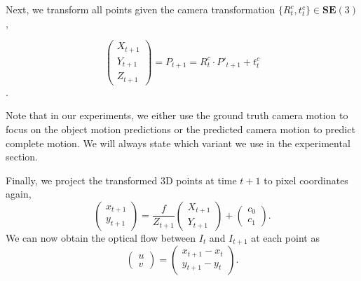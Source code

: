 Next, we transform all points given the camera transformation $\{R_t^c, t_t^c\} \in \mathbf{SE}(3)$, %

\begin{equation}
\begin{pmatrix}
X_{t+1} \\ Y_{t+1} \\ Z_{t+1}
\end{pmatrix}
= P_{t+1} = R_t^c \cdot P'_{t+1} + t_t^c
\end{equation}.

Note that in our experiments, we either use the ground truth camera motion to focus
on the object motion predictions or the predicted camera motion to predict complete
motion. We will always state which variant we use in the experimental section.

Finally, we project the transformed 3D points at time $t+1$ to pixel coordinates again,
\begin{equation}
\begin{pmatrix}
x_{t+1} \\ y_{t+1}
\end{pmatrix}
=
\frac{f}{Z_{t+1}}
\begin{pmatrix}
X_{t+1} \\ Y_{t+1}
\end{pmatrix}
+
\begin{pmatrix}
c_0 \\ c_1
\end{pmatrix}.
\end{equation}
We can now obtain the optical flow between $I_t$ and $I_{t+1}$ at each point as
\begin{equation}
\begin{pmatrix}
u \\ v
\end{pmatrix}
=
\begin{pmatrix}
x_{t+1} - x_{t} \\ y_{t+1} - y_{t}
\end{pmatrix}.
\end{equation}
